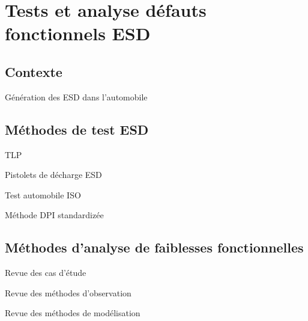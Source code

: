 \chapter{Tests et analyse défauts fonctionnels ESD}
\label{chap:1}
\section{Contexte}

Génération des ESD dans l'automobile


\section{Méthodes de test ESD}

TLP

Pistolets de décharge ESD

Test automobile ISO

Méthode DPI standardizée

\section{Méthodes d'analyse de faiblesses fonctionnelles}

Revue des cas d'étude

Revue des méthodes d'observation

Revue des méthodes de modélisation
